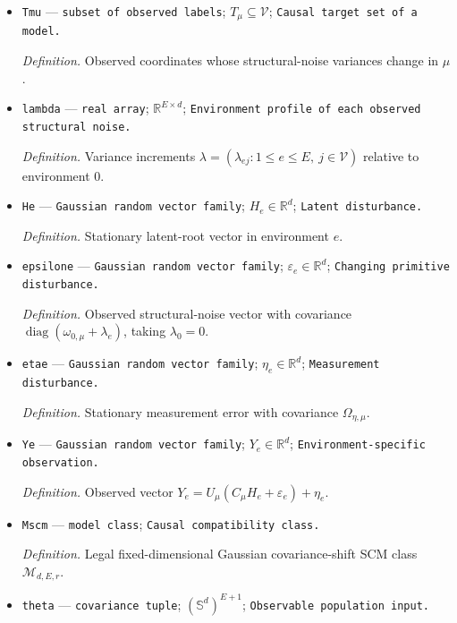 \documentclass{article}
\begin{document}
\begin{itemize}
  \par\smallskip\noindent\emph{Definition.} Invariant measurement-error covariance \(\Omega_{\eta,\mu}\).
  \item \texttt{Tmu} --- \texttt{subset of observed labels}; \(T_{\mu}\subseteq\mathcal V\); \texttt{Causal target set of a model.}
  \par\smallskip\noindent\emph{Definition.} Observed coordinates whose structural-noise variances change in \(\mu\).
  \item \texttt{lambda} --- \texttt{real array}; \(\mathbb R^{E\times d}\); \texttt{Environment profile of each observed structural noise.}
  \par\smallskip\noindent\emph{Definition.} Variance increments \(\lambda=(\lambda_{ej}:1\le e\le E,\ j\in\mathcal V)\) relative to environment \(0\).
  \item \texttt{He} --- \texttt{Gaussian random vector family}; \(H_e\in\mathbb R^{d}\); \texttt{Latent disturbance.}
  \par\smallskip\noindent\emph{Definition.} Stationary latent-root vector in environment \(e\).
  \item \texttt{epsilone} --- \texttt{Gaussian random vector family}; \(\varepsilon_e\in\mathbb R^d\); \texttt{Changing primitive disturbance.}
  \par\smallskip\noindent\emph{Definition.} Observed structural-noise vector with covariance \(\operatorname{diag}(\omega_{0,\mu}+\lambda_e)\), taking \(\lambda_0=0\).
  \item \texttt{etae} --- \texttt{Gaussian random vector family}; \(\eta_e\in\mathbb R^d\); \texttt{Measurement disturbance.}
  \par\smallskip\noindent\emph{Definition.} Stationary measurement error with covariance \(\Omega_{\eta,\mu}\).
  \item \texttt{Ye} --- \texttt{Gaussian random vector family}; \(Y_e\in\mathbb R^d\); \texttt{Environment-\allowbreak{}specific observation.}
  \par\smallskip\noindent\emph{Definition.} Observed vector \(Y_e=U_{\mu}(C_{\mu}H_e+\varepsilon_e)+\eta_e\).
  \item \texttt{Mscm} --- \texttt{model class}; \texttt{Causal compatibility class.}
  \par\smallskip\noindent\emph{Definition.} Legal fixed-dimensional Gaussian covariance-shift SCM class \(\mathcal M_{d,E,r}\).
  \item \texttt{theta} --- \texttt{covariance tuple}; \((\mathbb S^d)^{E+1}\); \texttt{Observable population input.}

\end{itemize}
\end{document}
